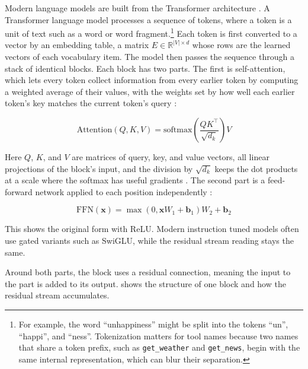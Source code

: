 Modern language models are built from the Transformer architecture \cite{vaswani2017attention}.
A Transformer language model processes a sequence of tokens, where a token is a unit of text such as a word or word fragment.\footnote{For example, the word ``unhappiness'' might be split into the tokens ``un'', ``happi'', and ``ness''. Tokenization matters for tool names because two names that share a token prefix, such as \texttt{get\_weather} and \texttt{get\_news}, begin with the same internal representation, which can blur their separation.}
Each token is first converted to a vector by an embedding table, a matrix $E \in \mathbb{R}^{|V| \times d}$ whose rows are the learned vectors of each vocabulary item.
The model then passes the sequence through a stack of identical blocks.
Each block has two parts.
The first is self-attention, which lets every token collect information from every earlier token by computing a weighted average of their values, with the weights set by how well each earlier token's key matches the current token's query \cite[p.~4]{vaswani2017attention}:

\begin{equation}
\mathrm{Attention}(Q, K, V) = \mathrm{softmax}\!\left(\frac{QK^\top}{\sqrt{d_k}}\right) V
\label{eq:attention}
\end{equation}

Here $Q$, $K$, and $V$ are matrices of query, key, and value vectors, all linear projections of the block's input, and the division by $\sqrt{d_k}$ keeps the dot products at a scale where the softmax has useful gradients \cite[p.~4]{vaswani2017attention}.
The second part is a feed-forward network applied to each position independently \cite[p.~5]{vaswani2017attention}:

\begin{equation}
\mathrm{FFN}(\mathbf{x}) = \max(0, \mathbf{x}W_1 + \mathbf{b}_1) W_2 + \mathbf{b}_2
\label{eq:ffn}
\end{equation}

This shows the original form with ReLU.
Modern instruction tuned models often use gated variants such as SwiGLU, while the residual stream reading stays the same.

Around both parts, the block uses a residual connection, meaning the input to the part is added to its output.
 shows the structure of one block and how the residual stream accumulates.

